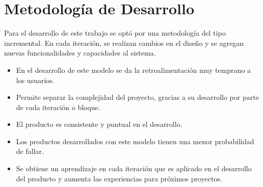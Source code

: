 \chapter{Metodología de Desarrollo}
\label{chap:metodologia}

Para el desarrollo de este trabajo se opt\'o por una metodolog\'ia del tipo incremental.
En cada iteraci\'on, se realizan cambios en el dise\~no y se agregan nuevas funcionalidades y capacidades al sistema.
\begin{itemize}
\item En el desarrollo de este modelo se da la retroalimentaci\'on muy temprano a los usuarios.
\item Permite separar la complejidad del proyecto, gracias a su desarrollo por parte de cada iteraci\'on o bloque.
\item El producto es consistente y puntual en el desarrollo.
\item Los productos desarrollados con este modelo tienen una menor probabilidad de fallar.
\item Se obtiene un aprendizaje en cada iteraci\'on que es aplicado en el desarrollo del producto y aumenta las experiencias para pr\'oximos proyectos.
\end{itemize}



